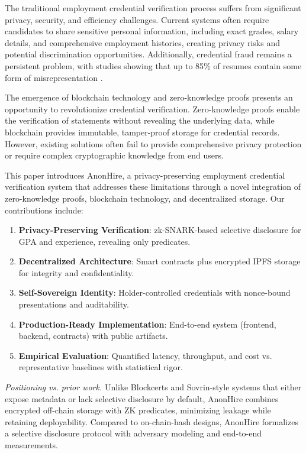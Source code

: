 \documentclass[conference]{IEEEtran}
\begin{document}
The traditional employment credential verification process suffers from significant privacy, security, and efficiency challenges. Current systems often require candidates to share sensitive personal information, including exact grades, salary details, and comprehensive employment histories, creating privacy risks and potential discrimination opportunities. Additionally, credential fraud remains a persistent problem, with studies showing that up to 85\% of resumes contain some form of misrepresentation \cite{levashina2007measuring}.

The emergence of blockchain technology and zero-knowledge proofs presents an opportunity to revolutionize credential verification. Zero-knowledge proofs enable the verification of statements without revealing the underlying data, while blockchain provides immutable, tamper-proof storage for credential records. However, existing solutions often fail to provide comprehensive privacy protection or require complex cryptographic knowledge from end users.

This paper introduces AnonHire, a privacy-preserving employment credential verification system that addresses these limitations through a novel integration of zero-knowledge proofs, blockchain technology, and decentralized storage. Our contributions include:

\begin{enumerate}
\item \textbf{Privacy-Preserving Verification}: zk-SNARK-based selective disclosure for GPA and experience, revealing only predicates.
\item \textbf{Decentralized Architecture}: Smart contracts plus encrypted IPFS storage for integrity and confidentiality.
\item \textbf{Self-Sovereign Identity}: Holder-controlled credentials with nonce-bound presentations and auditability.
\item \textbf{Production-Ready Implementation}: End-to-end system (frontend, backend, contracts) with public artifacts.
\item \textbf{Empirical Evaluation}: Quantified latency, throughput, and cost vs. representative baselines with statistical rigor.
\end{enumerate}

\noindent\textit{Positioning vs. prior work.} Unlike Blockcerts and Sovrin-style systems that either expose metadata or lack selective disclosure by default, AnonHire combines encrypted off-chain storage with ZK predicates, minimizing leakage while retaining deployability. Compared to on-chain-hash designs, AnonHire formalizes a selective disclosure protocol with adversary modeling and end-to-end measurements.
\end{document}
